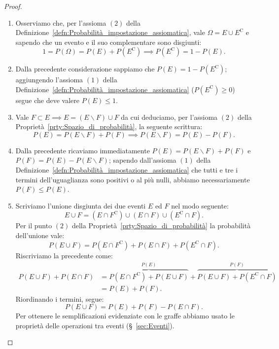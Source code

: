         \begin{proof}
            \hfill
            \begin{enumerate}
                \item Osserviamo che, per l'assioma $(2)$ della Definizione~\ref{defn:Probabilità_impostazione_assiomatica}, vale $\Omega = E \cup E^{\text{C}}$ e sapendo che un evento e il suo complementare sono disgiunti: \[
                    1 = P(\Omega)= P(E) + P(E^{\text{C}}) \implies P(E^{\text{C}}) = 1 - P(E)
                .\] 
                \item Dalla precedente considerazione sappiamo che $P(E) = 1 - P(E^{\text{C}})$; aggiungendo l'assioma $(1)$ della Definizione~\ref{defn:Probabilità_impostazione_assiomatica} ($P(E^{\text{C}}) \geq 0$) segue che deve valere $P(E) \leq 1$.
                \item Vale $F \subset E \implies E = (E \backslash F) \cup F$ da cui deduciamo, per l'assioma $(2)$ della Proprietà~\ref{prty:Spazio_di_probabilità}, la seguente scrittura: \[
                    P(E) = P(E \backslash F) + P(F) \implies P(E \backslash F) = P(E) - P(F)
                .\] 
                \item Dalla precedente ricaviamo immediatamente $P(E) = P(E \backslash F) + P(F)$ e  $P(F) = P(E) - P(E \backslash F)$; sapendo dall'assioma $(1)$ della Definizione~\ref{defn:Probabilità_impostazione_assiomatica} che tutti e tre i termini dell'uguaglianza sono positivi o al più nulli, abbiamo necessariamente $P(F) \leq P(E)$.
                \item Scriviamo l'unione disgiunta dei due eventi $E$ ed  $F$ nel modo seguente:  \[
                    E \cup F = (E \cap F^{\text{C}}) \cup (E \cap F) \cup (E^{\text{C}} \cap F)
                .\] Per il punto $(2)$ della Proprietà~\ref{prty:Spazio_di_probabilità} la probabilità dell'unione vale: \[
                    P(E \cup F) = P(E \cap F^{\text{C}}) + P(E \cap F) + P(E^{\text{C}} \cap F)
                .\] Riscriviamo la precedente come:
                \begin{align*}
                    P(E \cup F) + P(E \cap F) &= \overset{P(E)}{\overbrace{P(E \cap F^{\text{C}}) + P(E \cup F)}} + \overset{P(F)}{\overbrace{P(E \cup F) + P(E^{\text{C}} \cap F)}} \\ {}&= P(E) + P(F)
                .
                \end{align*}
                Riordinando i termini, segue:
                \[
                    P(E \cup F) = P(E) + P(F) - P(E \cap F)
                .\] 
                Per ottenere le semplificazioni evidenziate con le graffe abbiamo usato le proprietà delle operazioni tra eventi (§~\ref{sec:Eventi}). \qedhere
            \end{enumerate}
        \end{proof}
